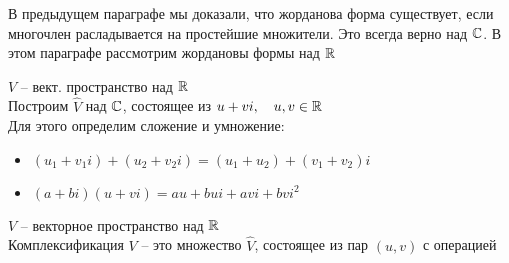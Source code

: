 В предыдущем параграфе мы доказали, что жорданова форма существует, если многочлен расладывается на простейшие множители. Это всегда верно над $ \mathbb{C} $. В этом параграфе рассмотрим жордановы формы над $ \mathbb{R} $

\begin{undefthm}
	$ V $ -- вект. пространство над $ \mathbb{R} $ \\
	Построим $ \hat{V} $ над $ \mathbb{C} $, состоящее из $ u + vi, \quad u, v \in \mathbb{R} $ \\
	Для этого определим сложение и умножение:
	\begin{itemize}
		\item $ (u_1 + v_1i) + (u_2 + v_2i) = (u_1 + u_2) + (v_1 + v_2)i $
		\item $ (a + bi)(u + vi) = au + bui + avi + bvi^2 $
	\end{itemize}
\end{undefthm}

\begin{definition}
	$ V $ -- векторное пространство над $ \mathbb{R} $ \\
	Комплексификация $ V $ -- это множество $ \hat{V} $, состоящее из пар $ (u, v) $ с операцией
\end{definition}
